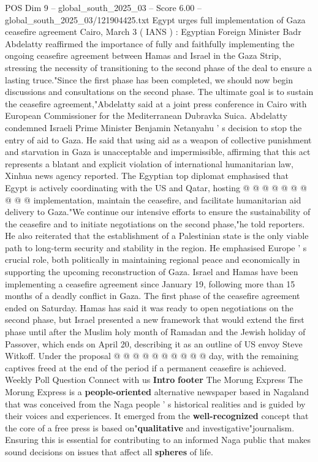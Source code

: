 \begin{textsample}{POS Dim 9 – global\_south\_2025\_03 – Score 6.00 – global\_south\_2025\_03/121904425.txt}  \label{ex:f9_pos_135}
Egypt urges full implementation of Gaza ceasefire agreement Cairo, March 3 ( IANS ) : Egyptian Foreign Minister Badr Abdelatty reaffirmed the importance of fully and faithfully implementing the ongoing ceasefire agreement between Hamas and Israel in the Gaza Strip, stressing the necessity of transitioning to the second phase of the deal to ensure a lasting truce."Since the first phase has been completed, we should now begin discussions and consultations on the second phase.
The ultimate goal is to sustain the ceasefire agreement,"Abdelatty said at a joint press conference in Cairo with European Commissioner for the Mediterranean Dubravka Suica.
Abdelatty condemned Israeli Prime Minister Benjamin Netanyahu ' s decision to stop the entry of aid to Gaza.
He said that using aid as a weapon of collective punishment and starvation in Gaza is unacceptable and impermissible, affirming that this act represents a blatant and explicit violation of international humanitarian law, Xinhua news agency reported.
The Egyptian top diplomat emphasised that Egypt is actively coordinating with the US and Qatar, hosting @ @ @ @ @ @ @ @ @ @ implementation, maintain the ceasefire, and facilitate humanitarian aid delivery to Gaza."We continue our intensive efforts to ensure the sustainability of the ceasefire and to initiate negotiations on the second phase,"he told reporters.
He also reiterated that the establishment of a Palestinian state is the only viable path to long-term security and stability in the region.
He emphasised Europe ' s crucial role, both politically in maintaining regional peace and economically in supporting the upcoming reconstruction of Gaza.
Israel and Hamas have been implementing a ceasefire agreement since January 19, following more than 15 months of a deadly conflict in Gaza.
The first phase of the ceasefire agreement ended on Saturday.
Hamas has said it was ready to open negotiations on the second phase, but Israel presented a new framework that would extend the first phase until after the Muslim holy month of Ramadan and the Jewish holiday of Passover, which ends on April 20, describing it as an outline of US envoy Steve Witkoff.
Under the proposal @ @ @ @ @ @ @ @ @ @ day, with the remaining captives freed at the end of the period if a permanent ceasefire is achieved.
Weekly Poll Question Connect with us \textbf{Intro} \textbf{footer} The Morung Express The Morung Express is a \textbf{people-oriented} alternative newspaper based in Nagaland that was conceived from the Naga people ' s historical realities and is guided by their voices and experiences.
It emerged from the \textbf{well-recognized} concept that the core of a free press is based on"\textbf{qualitative} and investigative"journalism.
Ensuring this is essential for contributing to an informed Naga public that makes sound decisions on issues that affect all \textbf{spheres} of life.

\end{textsample}

